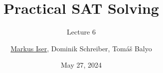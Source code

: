 \documentclass[t]{sdqbeamer}
\title[SAT Solving]{Practical SAT Solving}
\subtitle{Lecture 6}
\author{\underline{Markus Iser}, Dominik Schreiber, Tom\'a\v{s} Balyo}
\date{May 27, 2024}
\begin{document}
\begin{frame}
	\thispagestyle{empty}
	\titlepage
\end{frame}


\end{document}
